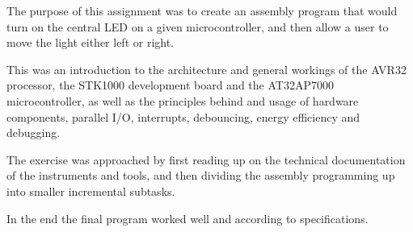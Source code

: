 The purpose of this assignment was to create an assembly program that would turn on the central LED on a given microcontroller, and then allow a user to move the light either left or right.

This was an introduction to the architecture and general workings of the AVR32 processor, the STK1000 development board and the AT32AP7000 microcontroller, as well as the principles behind and usage of hardware components, parallel I/O, interrupts, debouncing, energy efficiency and debugging.

The exercise was approached by first reading up on the technical documentation of the instruments and tools, and then dividing the assembly programming up into smaller incremental subtasks.

In the end the final program worked well and according to specifications.
